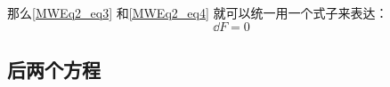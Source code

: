 那么\autoref{MWEq2_eq3} 和\autoref{MWEq2_eq4} 就可以统一用一个式子来表达：
\begin{equation}
\dd F = 0
\end{equation}






\subsection{后两个方程}










